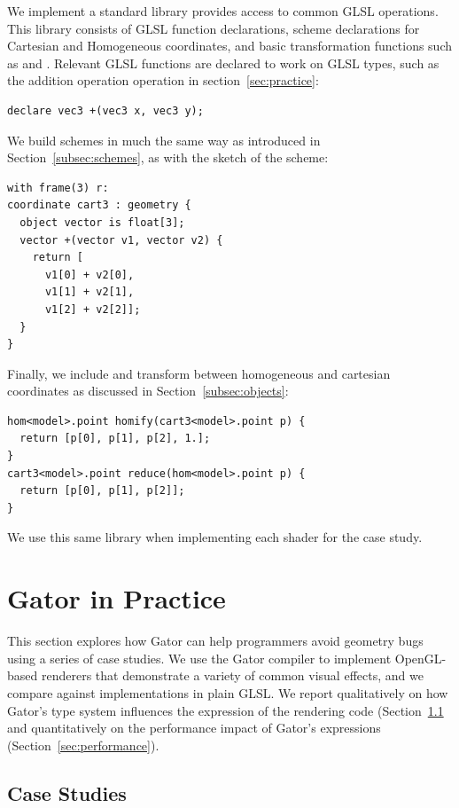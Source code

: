 {We implement a standard library provides access to common GLSL operations.  This library consists of GLSL function declarations, scheme declarations for Cartesian and Homogeneous coordinates, and basic transformation functions such as  and .  Relevant GLSL functions are declared to work on GLSL types, such as the addition operation operation in section~\ref{sec:practice}:
%
\begin{lstlisting}
declare vec3 +(vec3 x, vec3 y);
\end{lstlisting}
%
We build schemes in much the same way as introduced in Section~\ref{subsec:schemes}, as with the sketch of the  scheme:
%
\begin{lstlisting}
with frame(3) r:
coordinate cart3 : geometry {
  object vector is float[3];
  vector +(vector v1, vector v2) {
	return [
	  v1[0] + v2[0], 
	  v1[1] + v2[1], 
	  v1[2] + v2[2]];
  }
}
\end{lstlisting}
%
Finally, we include  and  transform between homogeneous and cartesian coordinates as discussed in Section~\ref{subsec:objects}:
%
\begin{lstlisting}
hom<model>.point homify(cart3<model>.point p) {
  return [p[0], p[1], p[2], 1.]; 
}
cart3<model>.point reduce(hom<model>.point p) {
  return [p[0], p[1], p[2]]; 
}
\end{lstlisting}
%
We use this same library when implementing each shader for the case study.
\section{Gator in Practice}
\label{sec:inpractice}

This section explores how Gator can help programmers avoid geometry bugs using a series of case studies.
We use the Gator compiler to implement OpenGL-based renderers that demonstrate a variety of common visual effects,
and we compare against implementations in plain GLSL.
We report qualitatively on how Gator's type system influences the expression of the rendering code (Section~\ref{sec:casestudies} and quantitatively on the performance impact of Gator's  expressions (Section~\ref{sec:performance}).

\subsection{Case Studies}
\label{sec:casestudies}

}
